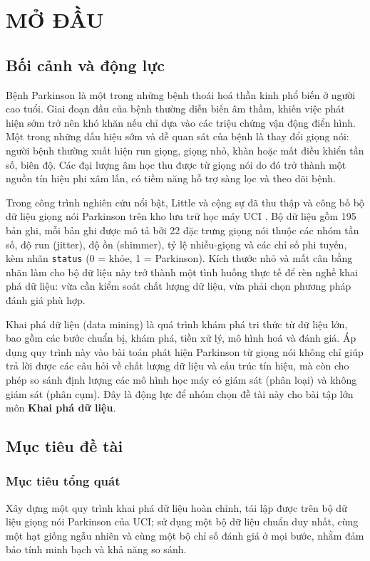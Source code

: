 \chapter{MỞ ĐẦU}
\label{chap:introduction}

\section{Bối cảnh và động lực}

Bệnh Parkinson là một trong những bệnh thoái hoá thần kinh phổ biến ở người cao tuổi.
Giai đoạn đầu của bệnh thường diễn biến âm thầm, khiến việc phát hiện sớm trở nên khó khăn
nếu chỉ dựa vào các triệu chứng vận động điển hình. Một trong những dấu hiệu sớm và dễ
quan sát của bệnh là thay đổi giọng nói: người bệnh thường xuất hiện run giọng, giọng nhỏ,
khàn hoặc mất điều khiển tần số, biên độ. Các đại lượng âm học thu được từ giọng nói do đó
trở thành một nguồn tín hiệu phi xâm lấn, có tiềm năng hỗ trợ sàng lọc và theo dõi bệnh.

Trong công trình nghiên cứu nổi bật, Little và cộng sự đã thu thập và công bố bộ dữ liệu
giọng nói Parkinson trên kho lưu trữ học máy UCI \cite{little2009,uci_parkinsons}. Bộ dữ liệu
gồm 195 bản ghi, mỗi bản ghi được mô tả bởi 22 đặc trưng giọng nói thuộc các nhóm tần số,
độ run (jitter), độ ồn (shimmer), tỷ lệ nhiễu-giọng và các chỉ số phi tuyến, kèm nhãn
\texttt{status} (0 = khỏe, 1 = Parkinson). Kích thước nhỏ và mất cân bằng nhãn làm cho bộ dữ
liệu này trở thành một tình huống thực tế để rèn nghề khai phá dữ liệu: vừa cần kiểm soát
chất lượng dữ liệu, vừa phải chọn phương pháp đánh giá phù hợp.

Khai phá dữ liệu (data mining) là quá trình khám phá tri thức từ dữ liệu lớn, bao gồm các
bước chuẩn bị, khám phá, tiền xử lý, mô hình hoá và đánh giá. Áp dụng quy trình này vào bài
toán phát hiện Parkinson từ giọng nói không chỉ giúp trả lời được các câu hỏi về chất lượng
dữ liệu và cấu trúc tín hiệu, mà còn cho phép so sánh định lượng các mô hình học máy có giám
sát (phân loại) và không giám sát (phân cụm). Đây là động lực để nhóm chọn đề tài này cho
bài tập lớn môn \textbf{Khai phá dữ liệu}.

\section{Mục tiêu đề tài}

\subsection{Mục tiêu tổng quát}
Xây dựng một quy trình khai phá dữ liệu hoàn chỉnh, tái lập được trên bộ dữ liệu giọng nói
Parkinson của UCI; sử dụng một bộ dữ liệu chuẩn duy nhất, cùng một hạt giống ngẫu nhiên và
cùng một bộ chỉ số đánh giá ở mọi bước, nhằm đảm bảo tính minh bạch và khả năng so sánh.

